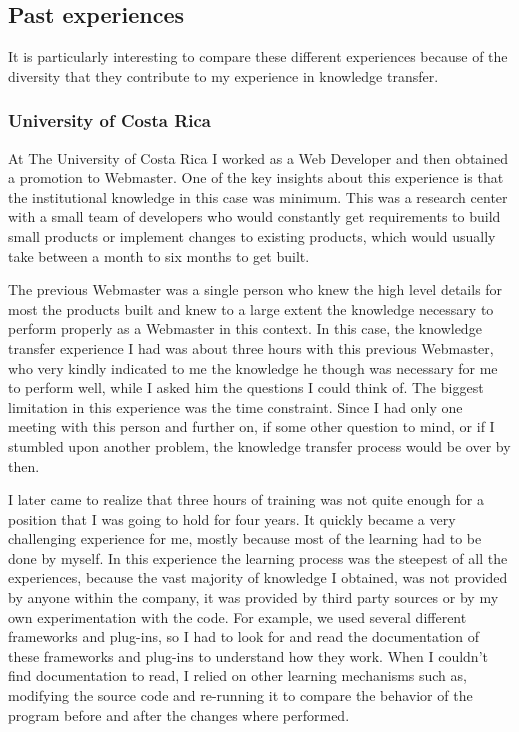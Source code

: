 \documentclass[12pt, letterpaper]{article}
\begin{document}
\subsection{Past experiences}
It is particularly interesting to compare these different experiences because of the diversity that they contribute
to my experience in knowledge transfer.

\subsubsection{University of Costa Rica}
At The University of Costa Rica I worked as a Web Developer and then obtained a promotion to Webmaster. 
One of the key insights about this experience is that the institutional knowledge 
in this case was minimum.
This was a research center with a small team of developers who would constantly get requirements to build small products 
or implement changes to existing products, which would usually take between a month to six months to get built.

The previous Webmaster was a single person who knew the high level details for most the products built and knew to a 
large extent the knowledge necessary to perform properly as a Webmaster in this context.
In this case, the knowledge transfer experience I had was about three hours with this previous Webmaster, who very kindly
indicated to me the knowledge he though was necessary for me to perform well, while I asked him the questions I could 
think of. The biggest limitation in this experience was the time constraint. Since I had only one meeting with 
this person and further on, if some other question to mind, or if I stumbled upon another problem, the knowledge
transfer process would be over by then.

I later came to realize that three hours of training was not quite enough for a position that I was going to hold for four
years. It quickly became a very challenging experience for me, mostly because most of the learning had to be done 
by myself. In this experience the learning process was the steepest of all the experiences, because the vast 
majority of knowledge I obtained, was not provided by anyone within the company, it was provided by third party
sources or by my own experimentation with the code. For example, we used several different frameworks and plug-ins, so I had to look for and read the documentation of 
these frameworks and plug-ins to understand how they work. When I couldn't find documentation to read, I relied
on other learning mechanisms such as, modifying the source code and re-running it to compare the behavior of the program
before and after the changes where performed. 
\end{document}
